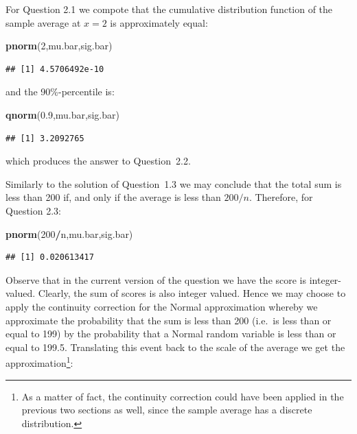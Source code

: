 \documentclass[]{krantz}
\makeatletter
\newenvironment{Shaded}{\begin{snugshade}}{\end{snugshade}}
\newcommand{\KeywordTok}[1]{\textcolor[rgb]{0.13,0.29,0.53}{\textbf{#1}}}
\newcommand{\DecValTok}[1]{\textcolor[rgb]{0.00,0.00,0.81}{#1}}
\newcommand{\FloatTok}[1]{\textcolor[rgb]{0.00,0.00,0.81}{#1}}
\newcommand{\OperatorTok}[1]{\textcolor[rgb]{0.81,0.36,0.00}{\textbf{#1}}}
\newcommand{\NormalTok}[1]{#1}
\newenvironment{kframe}{%
\medskip{}
\setlength{\fboxsep}{.8em}
 \def\at@end@of@kframe{}%
 \ifinner\ifhmode%
  \def\at@end@of@kframe{\end{minipage}}%
  \begin{minipage}{\columnwidth}%
 \fi\fi%
 \def\FrameCommand##1{\hskip\@totalleftmargin \hskip-\fboxsep
 \colorbox{shadecolor}{##1}\hskip-\fboxsep
     \hskip-\linewidth \hskip-\@totalleftmargin \hskip\columnwidth}%
 \MakeFramed {\advance\hsize-\width
   \@totalleftmargin\z@ \linewidth\hsize
   \@setminipage}}%
 {\par\unskip\endMakeFramed%
 \at@end@of@kframe}
\renewenvironment{Shaded}{\begin{kframe}}{\end{kframe}}
\theoremstyle{definition}
\theoremstyle{definition}
\theoremstyle{definition}
\theoremstyle{remark}
\makeatother
\begin{document}
For Question 2.1 we compote that the cumulative distribution function of
the sample average at \(x=2\) is approximately equal:

\begin{Shaded}
\begin{Highlighting}[]
\KeywordTok{pnorm}\NormalTok{(}\DecValTok{2}\NormalTok{,mu.bar,sig.bar)}
\end{Highlighting}
\end{Shaded}

\begin{verbatim}
## [1] 4.5706492e-10
\end{verbatim}

and the 90\%-percentile is:

\begin{Shaded}
\begin{Highlighting}[]
\KeywordTok{qnorm}\NormalTok{(}\FloatTok{0.9}\NormalTok{,mu.bar,sig.bar)}
\end{Highlighting}
\end{Shaded}

\begin{verbatim}
## [1] 3.2092765
\end{verbatim}

which produces the answer to Question~2.2.

Similarly to the solution of Question~1.3 we may conclude that the total
sum is less than 200 if, and only if the average is less than \(200/n\).
Therefore, for Question 2.3:

\begin{Shaded}
\begin{Highlighting}[]
\KeywordTok{pnorm}\NormalTok{(}\DecValTok{200}\OperatorTok{/}\NormalTok{n,mu.bar,sig.bar)}
\end{Highlighting}
\end{Shaded}

\begin{verbatim}
## [1] 0.020613417
\end{verbatim}

Observe that in the current version of the question we have the score is
integer-valued. Clearly, the sum of scores is also integer valued. Hence
we may choose to apply the continuity correction for the Normal
approximation whereby we approximate the probability that the sum is
less than 200 (i.e.~is less than or equal to 199) by the probability
that a Normal random variable is less than or equal to 199.5.
Translating this event back to the scale of the average we get the
approximation\footnote{As a matter of fact, the continuity correction
  could have been applied in the previous two sections as well, since
  the sample average has a discrete distribution.}:
\end{document}
